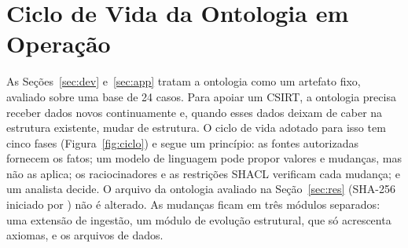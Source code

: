 %


\section{Ciclo de Vida da Ontologia em Operação}
\label{sec:ciclo}

As Seções~\ref{sec:dev} e~\ref{sec:app} tratam a ontologia como um artefato fixo, avaliado sobre uma base de 24 casos. Para apoiar um CSIRT, a ontologia precisa receber dados novos continuamente e, quando esses dados deixam de caber na estrutura existente, mudar de estrutura. O ciclo de vida adotado para isso tem cinco fases (Figura~\ref{fig:ciclo}) e segue um princípio: as fontes autorizadas fornecem os fatos; um modelo de linguagem pode propor valores e mudanças, mas não as aplica; os raciocinadores e as restrições SHACL verificam cada mudança; e um analista decide. O arquivo da ontologia avaliado na Seção~\ref{sec:res} (SHA-256 iniciado por \texttt{\vSevenHash}) não é alterado. As mudanças ficam em três módulos separados: uma extensão de ingestão, um módulo de evolução estrutural, que só acrescenta axiomas, e os arquivos de dados.

